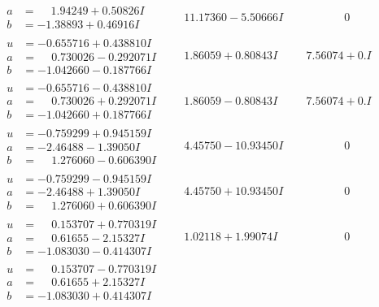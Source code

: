 \documentclass[1p]{elsarticle_modified}
\theoremstyle{definition}
\begin{document}
$$\begin{array}{c|c|c}
\begin{aligned}
a &= \phantom{-}1.94249 + 0.50826 I \\
b &= -1.38893 + 0.46916 I\end{aligned}
 & \phantom{-}11.17360 - 5.50666 I & \phantom{-0.000000 } 0 \\ \hline\begin{aligned}
u &= -0.655716 + 0.438810 I \\
a &= \phantom{-}0.730026 - 0.292071 I \\
b &= -1.042660 - 0.187766 I\end{aligned}
 & \phantom{-}1.86059 + 0.80843 I & \phantom{-}7.56074 + 0. I\phantom{ +0.000000I} \\ \hline\begin{aligned}
u &= -0.655716 - 0.438810 I \\
a &= \phantom{-}0.730026 + 0.292071 I \\
b &= -1.042660 + 0.187766 I\end{aligned}
 & \phantom{-}1.86059 - 0.80843 I & \phantom{-}7.56074 + 0. I\phantom{ +0.000000I} \\ \hline\begin{aligned}
u &= -0.759299 + 0.945159 I \\
a &= -2.46488 - 1.39050 I \\
b &= \phantom{-}1.276060 - 0.606390 I\end{aligned}
 & \phantom{-}4.45750 - 10.93450 I & \phantom{-0.000000 } 0 \\ \hline\begin{aligned}
u &= -0.759299 - 0.945159 I \\
a &= -2.46488 + 1.39050 I \\
b &= \phantom{-}1.276060 + 0.606390 I\end{aligned}
 & \phantom{-}4.45750 + 10.93450 I & \phantom{-0.000000 } 0 \\ \hline\begin{aligned}
u &= \phantom{-}0.153707 + 0.770319 I \\
a &= \phantom{-}0.61655 - 2.15327 I \\
b &= -1.083030 - 0.414307 I\end{aligned}
 & \phantom{-}1.02118 + 1.99074 I & \phantom{-0.000000 } 0 \\ \hline\begin{aligned}
u &= \phantom{-}0.153707 - 0.770319 I \\
a &= \phantom{-}0.61655 + 2.15327 I \\
b &= -1.083030 + 0.414307 I\end{aligned}

\end{array}$$
\end{document}
